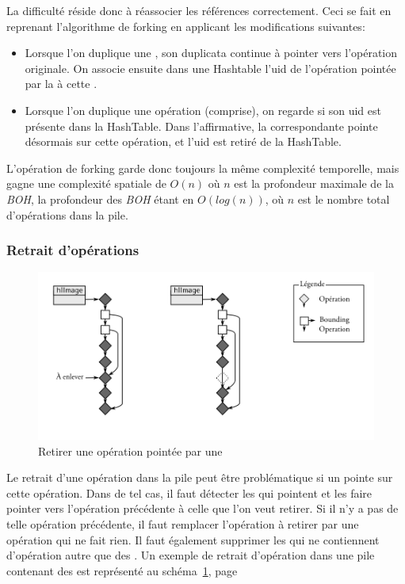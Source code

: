 			La difficulté réside donc à réassocier les références correctement. 
			Ceci se fait en reprenant l'algorithme de forking en applicant les modifications suivantes:
			\begin{itemize}
				\item Lorsque l'on duplique une \BO, son duplicata continue à pointer vers l'opération originale.
				On associe ensuite dans une Hashtable l'uid de l'opération pointée
				par la \BO à cette \BO. 
				\item Lorsque l'on duplique une opération (\BO comprise), on regarde si son uid est présente dans
				la HashTable. Dans l'affirmative, la \BO correspondante pointe désormais sur cette opération, et
				l'uid est retiré de la HashTable.
			\end{itemize}
			L'opération de forking garde donc toujours la même complexité temporelle, mais gagne une complexité spatiale
			de $O(n)$ où $n$ est la profondeur maximale de la \emph{BOH}, la profondeur des \emph{BOH} étant en $O(log(n))$, où $n$
			est le nombre total d'opérations dans la pile. 
			
			\subsubsection{Retrait d'opérations}
			\begin{figure}[ht]
				\centering
				\includegraphics[width=\textwidth]{images/bo-supress} 
				\caption{Retirer une opération pointée par une \BO}
				\label{fig:bo-supress}
			\end{figure}
			Le retrait d'une opération dans la pile peut être problématique si un \BO pointe sur cette opération. Dans de
			tel cas, il faut détecter les \BO qui pointent et les faire pointer vers l'opération précédente à celle
			que l'on veut retirer. Si il n'y a pas de telle opération précédente, il faut remplacer l'opération à retirer
			par une opération qui ne fait rien. Il faut également supprimer les \BO qui ne contiennent d'opération autre
			que des \BO.  Un exemple de retrait d'opération dans une pile contenant des \BO est représenté au 
			schéma~\ref{fig:bo-supress}, page~\pageref{fig:bo-supress}
			
